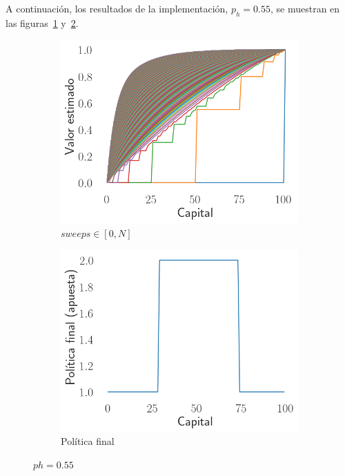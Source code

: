 A continuación, los resultados de la implementación, $p_h = 0.55$, se muestran en las figuras~\ref{fig:ph_055_sweeps} y~\ref{fig:ph_055_policy}.

\begin{figure}[H]
    \centering
    \begin{subfigure}[H]{0.45\textwidth}
        \includegraphics[width=\textwidth]{../img/sweeps_0.55}
        \caption{$sweeps \in [0, N]$}
        \label{fig:ph_055_sweeps}
    \end{subfigure}
    \begin{subfigure}[H]{0.45\textwidth}
        \includegraphics[width=\textwidth]{../img/policy_0.55}
        \caption{Política final}
        \label{fig:ph_055_policy}
    \end{subfigure}
    \caption{$ph=0.55$}
    \label{fig:ph_055_gamblers_problem}
\end{figure}

